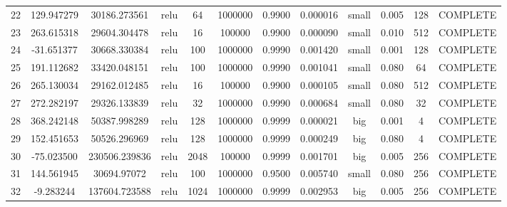 \begin{longtable}{cccccccccccc}
                       22 &                 129.947279 &                       30186.273561 &            relu &          64 &      1000000 & 0.9900 &       0.000016 &     small & 0.005 &         128 & COMPLETE \\
                       23 &                 263.615318 &                       29604.304478 &            relu &          16 &       100000 & 0.9900 &       0.000090 &     small & 0.010 &         512 & COMPLETE \\
                       24 &                 -31.651377 &                       30668.330384 &            relu &         100 &      1000000 & 0.9990 &       0.001420 &     small & 0.001 &         128 & COMPLETE \\
                       25 &                 191.112682 &                       33420.048151 &            relu &         100 &      1000000 & 0.9990 &       0.001041 &     small & 0.080 &          64 & COMPLETE \\
                       26 &                 265.130034 &                       29162.012485 &            relu &          16 &       100000 & 0.9900 &       0.000105 &     small & 0.080 &         512 & COMPLETE \\
                       27 &                 272.282197 &                       29326.133839 &            relu &          32 &      1000000 & 0.9990 &       0.000684 &     small & 0.080 &          32 & COMPLETE \\
                       28 &                 368.242148 &                       50387.998289 &            relu &         128 &      1000000 & 0.9999 &       0.000021 &       big & 0.001 &           4 & COMPLETE \\
                       29 &                 152.451653 &                       50526.296969 &            relu &         128 &      1000000 & 0.9999 &       0.000249 &       big & 0.080 &           4 & COMPLETE \\
                       30 &                 -75.023500 &                      230506.239836 &            relu &        2048 &       100000 & 0.9999 &       0.001701 &       big & 0.005 &         256 & COMPLETE \\
                       31 &                 144.561945 &                        30694.97072 &            relu &         100 &      1000000 & 0.9500 &       0.005740 &     small & 0.080 &         256 & COMPLETE \\
                       32 &                  -9.283244 &                      137604.723588 &            relu &        1024 &      1000000 & 0.9999 &       0.002953 &       big & 0.005 &         256 & COMPLETE \\

\end{longtable}
